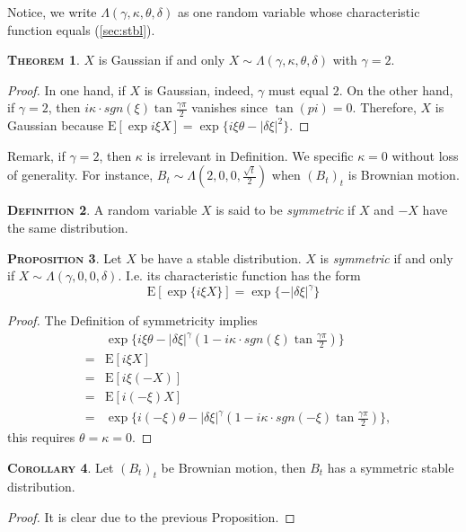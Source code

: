 \documentclass[a4paper, twoside, 11pt]{article}
\theoremstyle{definition}
\newtheorem{definition}{\scshape Definition}[section]
\newtheorem{theorem}[definition]{\scshape Theorem}
\newtheorem{proposition}[definition]{\scshape Proposition}
\newtheorem{corollary}[definition]{\scshape Corollary}
\begin{document}
Notice, we write $\Lambda(\gamma, \kappa, \theta, \delta)$ as one random variable whose characteristic function equals (\ref{sec:stbl}).

\begin{theorem}
  $X$ is Gaussian if and only $X \sim \Lambda(\gamma, \kappa, \theta, \delta)$ with $\gamma = 2$.
\end{theorem}
\begin{proof}
  In one hand, if $X$ is Gaussian, indeed, $\gamma$ must equal $2$. On the other hand, if $\gamma = 2$, then $i\kappa\cdot sgn(\xi)\tan \frac{\gamma\pi}{2}$ vanishes since $\tan(pi) = 0$. Therefore, $X$ is Gaussian because $\mathrm{E} [\exp i\xi X]=\exp\{i \xi \theta - |\delta\xi|^2\}$.
\end{proof}
Remark, if $\gamma=2$, then $\kappa$ is irrelevant in Definition. We specific $\kappa = 0$ without loss of generality. For instance, $B_t \sim \Lambda(2, 0, 0, \frac{\sqrt{t}}{2})$ when $(B_t)_t$ is Brownian motion.

\begin{definition}
  A random variable $X$ is said to be \emph{symmetric} if $X$ and $-X$ have the same distribution.
\end{definition}

\begin{proposition}
  Let $X$ be have a stable distribution. $X$ is  \emph{symmetric} if and only if $X \sim \Lambda(\gamma, 0, 0, \delta)$. I.e. its characteristic function has the form
  \begin{equation}
	\mathrm{E}[\exp\{i \xi X\}] = \exp\{-|\delta\xi|^\gamma\}
  \end{equation}
\end{proposition}
\begin{proof}
  The Definition of symmetricity implies
  \begin{eqnarray*}
	&&\exp\{i \xi \theta - |\delta\xi|^\gamma(1-i\kappa\cdot sgn(\xi)\tan \frac{\gamma\pi}{2})\}\\
	&=& \mathrm{E}[i\xi X]\\
	&=& \mathrm{E}[i\xi (-X)]\\
	&=& \mathrm{E}[i (-\xi) X]\\
	&=& \exp\{i (-\xi) \theta - |\delta\xi|^\gamma(1-i\kappa\cdot sgn(-\xi)\tan \frac{\gamma\pi}{2})\},
  \end{eqnarray*}
  this requires $\theta=\kappa=0$.
\end{proof}

\begin{corollary}
  Let $(B_t)_t$ be Brownian motion, then $B_t$ has a symmetric stable distribution.
\end{corollary}
\begin{proof}
  It is clear due to the previous Proposition.
\end{proof}
\end{document}
